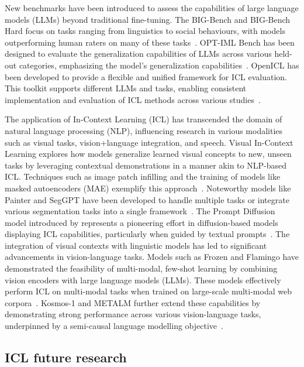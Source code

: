 New benchmarks have been introduced to assess the capabilities of large language models (LLMs) beyond traditional fine-tuning.
The BIG-Bench and BIG-Bench Hard focus on tasks ranging from linguistics to social behaviours, with models outperforming human raters on many of these tasks~\cite{srivastava2023imitation, suzgun2022challenging}.
OPT-IML Bench has been designed to evaluate the generalization capabilities of LLMs across various held-out categories, emphasizing the model's generalization capabilities~\cite{iyer2022opt}.
OpenICL has been developed to provide a flexible and unified framework for ICL evaluation.
This toolkit supports different LLMs and tasks, enabling consistent implementation and evaluation of ICL methods across various studies~\cite{wu2023openicl}.

The application of In-Context Learning (ICL) has transcended the domain of natural language processing (NLP), influencing research in various modalities such as visual tasks, vision+language integration, and speech.
Visual In-Context Learning explores how models generalize learned visual concepts to new, unseen tasks by leveraging contextual demonstrations in a manner akin to NLP-based ICL. Techniques such as image patch infilling and the training of models like masked autoencoders (MAE) exemplify this approach~\cite{bar2022visual}.
Noteworthy models like Painter and SegGPT have been developed to handle multiple tasks or integrate various segmentation tasks into a single framework~\cite{wang2023images, wang2023seggpt}.
The Prompt Diffusion model introduced by \textcite{wang2023incontext} represents a pioneering effort in diffusion-based models displaying ICL capabilities, particularly when guided by textual prompts~\cite{wang2023incontext}.
The integration of visual contexts with linguistic models has led to significant advancements in vision-language tasks.
Models such as Frozen and Flamingo have demonstrated the feasibility of multi-modal, few-shot learning by combining vision encoders with large language models (LLMs).
These models effectively perform ICL on multi-modal tasks when trained on large-scale multi-modal web corpora~\cite{tsimpoukelli2021frozen, alayrac2022flamingo}.
Kosmos-1 and METALM further extend these capabilities by demonstrating strong performance across various vision-language tasks, underpinned by a semi-causal language modelling objective~\cite{huang2023language, hao2022language}.

\subsection{ICL future research}
\label{subsec:icl-future}

